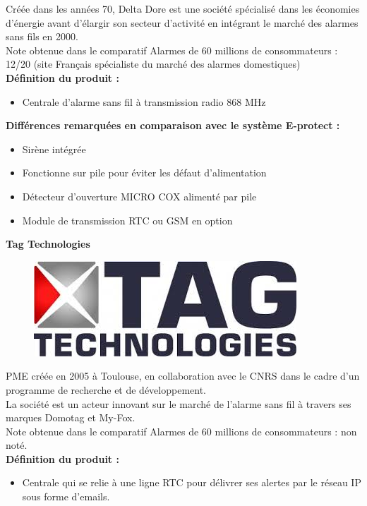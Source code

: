 Créée dans les années 70, Delta Dore est une société spécialisé dans les économies d'énergie avant d'élargir son secteur d'activité en intégrant le marché des alarmes sans fils en 2000.\\
Note obtenue dans le comparatif Alarmes de 60 millions de consommateurs : 12/20 (site Français spécialiste du marché des alarmes domestiques)\\

\textbf{Définition du produit :}
\begin{itemize}
\item Centrale d'alarme sans fil à transmission radio 868 MHz
\end{itemize}

\textbf{Différences remarquées en comparaison avec le système E-protect :}
\begin{itemize}
\item Sirène intégrée
\item Fonctionne sur pile pour éviter les défaut d'alimentation
\item Détecteur d'ouverture MICRO COX alimenté par pile
\item Module de transmission RTC ou GSM en option\\
\end{itemize}

\textbf{Tag Technologies}\\
\begin{figure}[h!]
	\begin{center}
		\includegraphics[width=0.4\linewidth]{../images/Tag}
	\end{center}
	\caption{\cite{www:Tag}}
\end{figure}

PME créée en 2005 à Toulouse, en collaboration avec le CNRS dans le cadre d'un programme de recherche et de développement.\\
La société est un acteur innovant sur le marché de l'alarme sans fil à travers ses marques Domotag et My-Fox.\\
Note obtenue dans le comparatif Alarmes de 60 millions de consommateurs : non noté.\\

\textbf{Définition du produit :}
\begin{itemize}
\item Centrale qui se relie à une ligne RTC pour délivrer ses alertes par le réseau IP sous forme d'emails.
\end{itemize}

